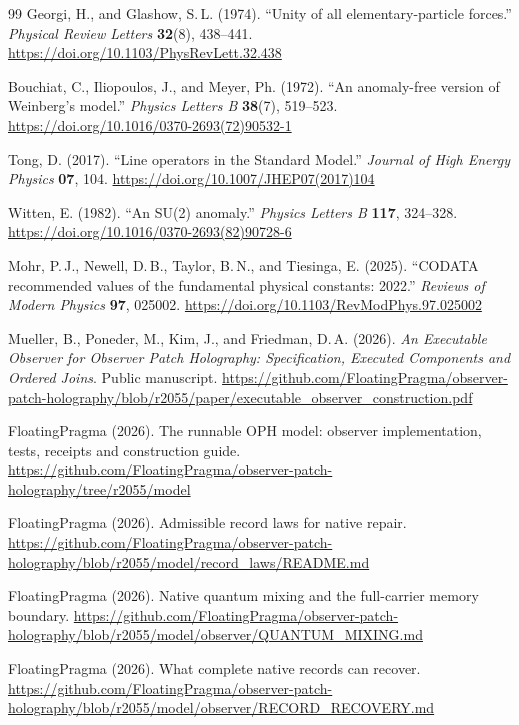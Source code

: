 \documentclass[11pt]{article}
\theoremstyle{definition}
\theoremstyle{remark}
\begin{document}
{\begin{thebibliography}{99}
Georgi, H., and Glashow, S.\,L. (1974). ``Unity of all elementary-particle
forces.'' \emph{Physical Review Letters} \textbf{32}(8), 438--441.
\url{https://doi.org/10.1103/PhysRevLett.32.438}

Bouchiat, C., Iliopoulos, J., and Meyer, Ph. (1972). ``An anomaly-free
version of Weinberg's model.'' \emph{Physics Letters B} \textbf{38}(7),
519--523.
\url{https://doi.org/10.1016/0370-2693(72)90532-1}

Tong, D. (2017). ``Line operators in the Standard Model.''
\emph{Journal of High Energy Physics} \textbf{07}, 104.
\url{https://doi.org/10.1007/JHEP07(2017)104}

Witten, E. (1982). ``An SU(2) anomaly.'' \emph{Physics Letters B}
\textbf{117}, 324--328.
\url{https://doi.org/10.1016/0370-2693(82)90728-6}

Mohr, P.\,J., Newell, D.\,B., Taylor, B.\,N., and Tiesinga, E. (2025).
``CODATA recommended values of the fundamental physical constants: 2022.''
\emph{Reviews of Modern Physics} \textbf{97}, 025002.
\url{https://doi.org/10.1103/RevModPhys.97.025002}

Mueller, B., Poneder, M., Kim, J., and Friedman, D.\,A. (2026). \emph{An Executable Observer for Observer
Patch Holography: Specification, Executed Components and Ordered Joins}. Public manuscript.
\url{https://github.com/FloatingPragma/observer-patch-holography/blob/r2055/paper/executable_observer_construction.pdf}

FloatingPragma (2026). The runnable OPH model: observer implementation,
tests, receipts and construction guide.
\url{https://github.com/FloatingPragma/observer-patch-holography/tree/r2055/model}

FloatingPragma (2026). Admissible record laws for native repair.
\url{https://github.com/FloatingPragma/observer-patch-holography/blob/r2055/model/record_laws/README.md}

FloatingPragma (2026). Native quantum mixing and the full-carrier memory
boundary.
\url{https://github.com/FloatingPragma/observer-patch-holography/blob/r2055/model/observer/QUANTUM_MIXING.md}

FloatingPragma (2026). What complete native records can recover.
\url{https://github.com/FloatingPragma/observer-patch-holography/blob/r2055/model/observer/RECORD_RECOVERY.md}


\end{thebibliography}}
\end{document}
